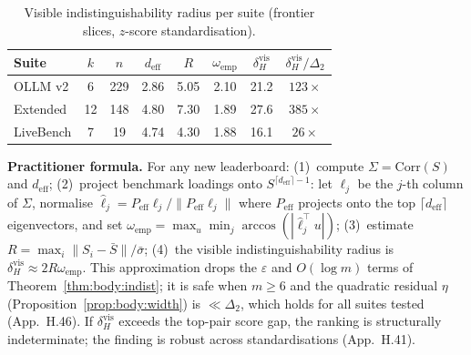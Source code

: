 \documentclass{article}
\begin{document}
\begin{table}[h]
\small\centering
\caption{Visible indistinguishability radius per suite (frontier
slices, $z$-score standardisation).}
\label{tab:calibration}
\begin{tabular}{lccccccc}
\toprule
Suite & $k$ & $n$ & $d_{\mathrm{eff}}$ & $R$ &
  $\omega_{\mathrm{emp}}$ & $\delta_H^{\mathrm{vis}}$ &
  $\delta_H^{\mathrm{vis}} / \Delta_2$ \\
\midrule
OLLM v2   &  6 & 229 & 2.86 & 5.05 & 2.10 & 21.2 &  $123\times$ \\
Extended  & 12 & 148 & 4.80 & 7.30 & 1.89 & 27.6 &  $385\times$ \\
LiveBench &  7 &  19 & 4.74 & 4.30 & 1.88 & 16.1 &   $26\times$ \\
\bottomrule
\end{tabular}
\end{table}

\noindent \textbf{Practitioner formula.} For any new leaderboard:
(1)~compute $\Sigma = \mathrm{Corr}(S)$ and $d_{\mathrm{eff}}$;
(2)~project benchmark loadings onto $S^{\lceil d_{\mathrm{eff}}
\rceil - 1}$: let $\ell_j$ be the $j$-th column of $\Sigma$,
normalise $\hat\ell_j = P_{\mathrm{eff}} \ell_j / \|P_{\mathrm{eff}}
\ell_j\|$ where $P_{\mathrm{eff}}$ projects onto the top
$\lceil d_{\mathrm{eff}} \rceil$ eigenvectors, and set
$\omega_{\mathrm{emp}} = \max_u \min_j \arccos(|\hat\ell_j^\top u|)$;
(3)~estimate $R = \max_i \|S_i - \bar S\| / \bar\sigma$;
(4)~the visible indistinguishability radius is
$\delta_H^{\mathrm{vis}} \approx 2R\omega_{\mathrm{emp}}$.
This approximation drops the $\varepsilon$ and $O(\log m)$ terms of
Theorem~\ref{thm:body:indist}; it is safe when $m \ge 6$ and the
quadratic residual $\eta$ (Proposition~\ref{prop:body:width}) is
$\ll \Delta_2$, which holds for all suites tested (App.~H.46).
If $\delta_H^{\mathrm{vis}}$ exceeds the top-pair score gap, the
ranking is structurally indeterminate; the finding is robust across
standardisations (App.~H.41).
\end{document}
